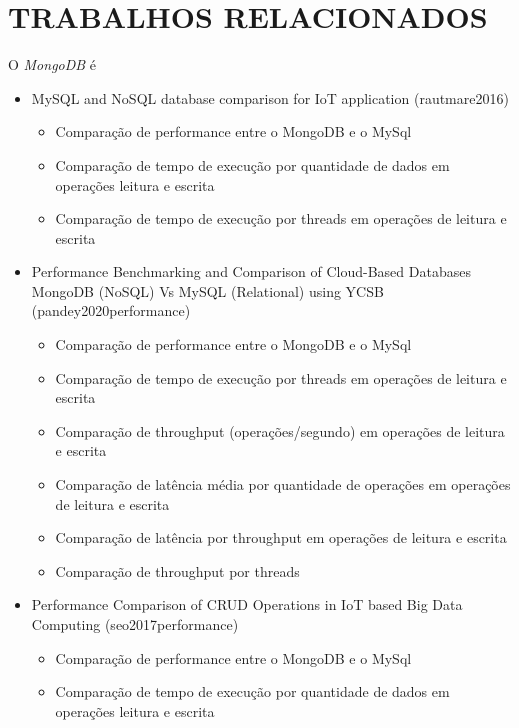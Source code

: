 \chapter{TRABALHOS RELACIONADOS}
\label{Trabalhos Relacionados}

O \textit{MongoDB} é 

\begin{itemize}
    \item MySQL and NoSQL database comparison for IoT application (rautmare2016)
    
        \begin{itemize}
            \item Comparação de performance entre o  MongoDB e o MySql
            \item Comparação de tempo de execução por quantidade de dados em operações leitura e escrita
            \item Comparação de tempo de execução por threads em operações de leitura e escrita
        \end{itemize}
        
    \item Performance Benchmarking and Comparison of Cloud-Based Databases MongoDB (NoSQL) Vs MySQL (Relational) using YCSB (pandey2020performance)
    
        \begin{itemize}
            \item Comparação de performance entre o  MongoDB e o MySql
            \item Comparação de tempo de execução por threads em operações de leitura e escrita
            \item Comparação de throughput (operações/segundo) em operações de leitura e escrita
            \item Comparação de latência média por quantidade de operações em operações de leitura e escrita
            \item Comparação de latência por throughput em operações de leitura e escrita
            \item Comparação de throughput por threads
        \end{itemize}
        
    \item Performance Comparison of CRUD Operations in IoT based Big Data Computing (seo2017performance)
    
        \begin{itemize}
            \item Comparação de performance entre o  MongoDB e o MySql
            \item Comparação de tempo de execução por quantidade de dados em operações leitura e escrita
        \end{itemize}
        

\end{itemize}
